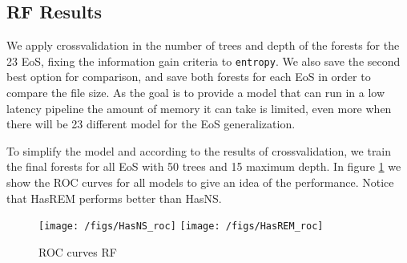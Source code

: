\subsection{RF Results}

We apply crossvalidation in the number of trees and depth of the forests for the 23 EoS, fixing the information gain criteria to \texttt{entropy}. We also save the second best option for comparison, and save both forests for each EoS in order to compare the file size. As the goal is to provide a model that can run in a low latency pipeline the amount of memory it can take is limited, even more when there will be 23 different model for the EoS generalization.

To simplify the model and according to the results of crossvalidation, we train the final forests for all EoS with 50 trees and 15 maximum depth. In figure \ref{fig:RF_roc} we show the ROC curves for all models to give an idea of the performance. Notice that HasREM performs better than HasNS. 
%
\begin{figure}
\centering
\texttt{[image: /figs/HasNS\_roc]}
\texttt{[image: /figs/HasREM\_roc]}
\caption{\label{fig:RF_roc} ROC curves RF}
\end{figure}




